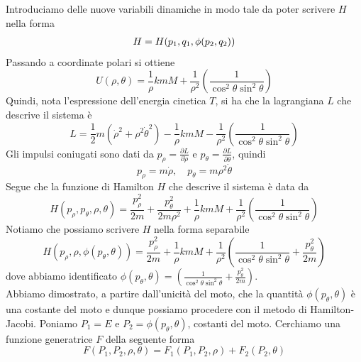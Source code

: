 \documentclass{article}
\begin{document}
Introduciamo delle nuove variabili dinamiche in modo tale da poter scrivere $H$ nella forma
\begin{align}
    H = H(p_1, q_1, \phi(p_2, q_2)) \notag 
\end{align}
Passando a coordinate polari si ottiene
\begin{equation}
    U(\rho, \theta) = \frac{1}{\rho}kmM + \frac{1}{\rho^2}\left( \frac{1}{\cos^2 \theta \sin^2 \theta} \right) \tag{8.2.2}
\end{equation}
Quindi, nota l'espressione dell'energia cinetica $T$, si ha che la lagrangiana $L$ che descrive il sistema è
\begin{equation}
    L = \frac{1}{2}m(\dot{\rho}^2 + \rho^2\dot{\theta}^2) - \frac{1}{\rho}kmM - \frac{1}{\rho^2}\left( \frac{1}{\cos^2 \theta \sin^2 \theta} \right) \tag{8.2.3}
\end{equation}
Gli impulsi coniugati sono dati da $p_\rho = \frac{\partial L}{\partial \dot{\rho}}$ e $p_\theta = \frac{\partial L}{\partial \dot{\theta}}$, quindi
\begin{equation}
    p_\rho = m\dot{\rho}, \quad p_\theta = m\rho^2\dot{\theta} \tag{8.2.4}
\end{equation}
Segue che la funzione di Hamilton $H$ che descrive il sistema è data da
\begin{equation}
    H(p_\rho, p_\theta, \rho, \theta) = \frac{p_\rho^2}{2m} + \frac{p_\theta^2}{2m\rho^2} + \frac{1}{\rho}kmM + \frac{1}{\rho^2}\left( \frac{1}{\cos^2 \theta \sin^2 \theta} \right) \tag{8.2.5}
\end{equation}
Notiamo che possiamo scrivere $H$ nella forma separabile
\begin{equation}
    H(p_\rho, \rho, \phi(p_\theta, \theta))  = \frac{p_\rho^2}{2m} + \frac{1}{\rho}kmM + \frac{1}{\rho^2}\left( \frac{1}{\cos^2 \theta \sin^2 \theta} + \frac{p_\theta^2}{2m} \right) \tag{8.2.6}
\end{equation}
dove abbiamo identificato $\phi(p_\theta, \theta) = \left( \frac{1}{\cos^2 \theta \sin^2 \theta} + \frac{p_\theta^2}{2m} \right)$. \\
Abbiamo dimostrato, a partire dall'unicità del moto, che la quantità $\phi(p_\theta, \theta)$ è una costante del moto e dunque possiamo procedere con il metodo di Hamilton-Jacobi. Poniamo $P_1 = E$ e $P_2 = \phi(p_\theta, \theta)$, costanti del moto. Cerchiamo una funzione generatrice $F$ della seguente forma
\begin{equation}
    F(P_1, P_2, \rho, \theta) = F_1(P_1, P_2, \rho) + F_2(P_2, \theta) \tag{8.2.7}
\end{equation}
\end{document}
